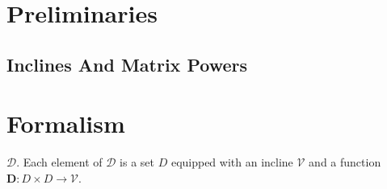 \documentclass{article}
\theoremstyle{plain}
\theoremstyle{definition}
\theoremstyle{remark}
\begin{document}
	
	\section{Preliminaries}
	\subsection{Inclines And Matrix Powers}
	
	
	
	\section{Formalism}
	 $\mathcal D$. Each element of $\mathcal D$ is a set $D$ equipped with an incline $\mathcal V$ and a function $\mathbf D: D \times D \to \mathcal V$.
	
	
	

%	
%	
\end{document}
